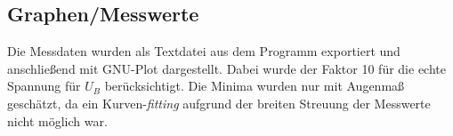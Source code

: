 \subsection{Graphen/Messwerte}
Die Messdaten wurden als Textdatei aus dem Programm exportiert und anschließend mit GNU-Plot dargestellt. Dabei wurde der Faktor 10 für die echte Spannung für \(U_B\) berücksichtigt. Die Minima wurden nur mit Augenmaß geschätzt, da ein Kurven-\textit{fitting} aufgrund der  breiten Streuung der Messwerte nicht möglich war. 
\begin{center}
\begin{minipage}{\linewidth}
\centering
{}
\label{a1}
\end{minipage}
\begin{minipage}{\linewidth}
\centering
{}

\end{minipage}
\end{center}
